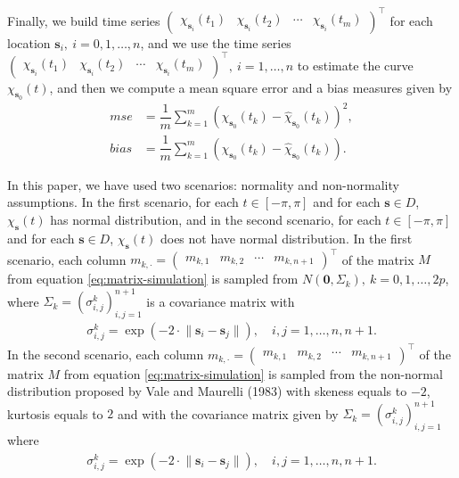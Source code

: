\documentclass[
  12pt,
]{article}
\theoremstyle{definition}
\theoremstyle{definition}
\theoremstyle{definition}
\theoremstyle{remark}
\begin{document}
Finally, we build time series \(\begin{pmatrix} \chi_{\bm{s}_i}(t_1) & \chi_{\bm{s}_i}(t_2) & \cdots & \chi_{\bm{s}_i}(t_m) \end{pmatrix}^\top\) for each location \(\bm{s}_i,\ i =0,1,\dots, n\), and we use the time series \(\begin{pmatrix} \chi_{\bm{s}_i}(t_1) & \chi_{\bm{s}_i}(t_2) & \cdots & \chi_{\bm{s}_i}(t_m) \end{pmatrix}^\top,\ i =1, \dots, n\) to estimate the curve \(\chi_{\bm{s}_0}(t)\), and then we compute a mean square error and a bias measures given by
\begin{align*}
 mse &=   \dfrac{1}{m} \sum_{k=1}^{m} (\chi_{\bm{s}_0}(t_k) - \hat{\chi}_{\bm{s}_0}(t_k))^2,\\
 bias &=   \dfrac{1}{m} \sum_{k=1}^{m} (\chi_{\bm{s}_0}(t_k) - \hat{\chi}_{\bm{s}_0}(t_k)).
\end{align*}

In this paper, we have used two scenarios: normality and non-normality assumptions. In the first scenario, for each \(t \in [-\pi, \pi]\) and for each \(\bm{s} \in D\), \(\chi_{\bm{s}}(t)\) has normal distribution, and in the second scenario, for each \(t \in [-\pi, \pi]\) and for each \(\bm{s} \in D\), \(\chi_{\bm{s}}(t)\) does not have normal distribution. In the first scenario, each column \(m_{k,\cdot} = \begin{pmatrix} m_{k,1} & m_{k,2} & \cdots & m_{k,n+1} \end{pmatrix}^\top\) of the matrix \(M\) from equation \eqref{eq:matrix-simulation} is sampled from \(N(\bm{0}, \Sigma_k),\ k=0,1,\dots, 2p\), where \(\Sigma_k = (\sigma_{i,j}^k)_{i,j=1}^{n+1}\) is a covariance matrix with
\begin{align*}
 \sigma_{i,j}^k = \exp \left( -2 \cdot \lVert \bm{s}_i - \bm{s}_j \rVert \right), \quad i,j=1, \dots, n, n+1.
\end{align*}
In the second scenario, each column \(m_{k,\cdot} = \begin{pmatrix} m_{k,1} & m_{k,2} & \cdots & m_{k,n+1} \end{pmatrix}^\top\) of the matrix \(M\) from equation \eqref{eq:matrix-simulation} is sampled from the non-normal distribution proposed by Vale and Maurelli (1983) with skeness equals to \(-2\), kurtosis equals to \(2\) and with the covariance matrix given by \(\Sigma_k = (\sigma_{i,j}^k)_{i,j=1}^{n+1}\) where
\begin{align*}
 \sigma_{i,j}^k = \exp \left( -2 \cdot \lVert \bm{s}_i - \bm{s}_j \rVert \right), \quad i,j=1, \dots, n, n+1.
\end{align*}
\end{document}
